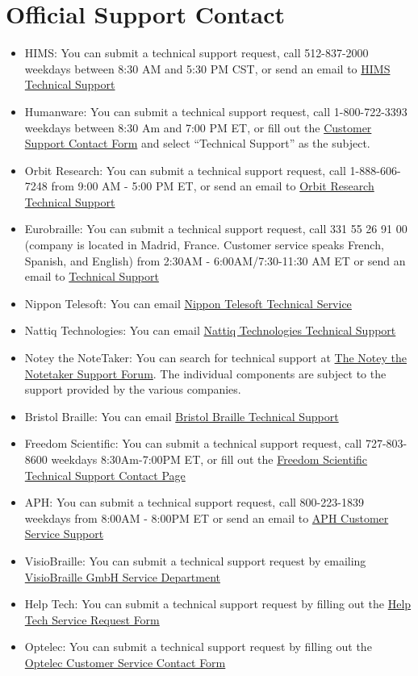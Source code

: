 \section{Official Support Contact}\label{report2}
\begin{itemize}
 \item HIMS: You can submit a technical support request, call 512-837-2000 weekdays between 8:30 AM and 5:30 PM CST, or send an email to \href{mailto:support@hims-inc.com}{HIMS Technical Support}
 \item Humanware: You can submit a technical support request, call 1-800-722-3393 weekdays between 8:30 Am and 7:00 PM ET, or fill out the \href{http://store.humanware.com/hus/contact/}{Customer Support Contact Form} and select ``Technical Support'' as the subject.
 \item Orbit Research: You can submit a technical support request, call 1-888-606-7248 from 9:00 AM - 5:00 PM ET, or send an email to \href{mailto:techsupport@orbitresearch.com}{Orbit Research Technical Support}
 \item Eurobraille: You can submit a technical support request, call 331 55 26 91 00 (company is located in Madrid, France. Customer service speaks French, Spanish, and English) from 2:30AM - 6:00AM/7:30-11:30 AM ET or send an email to \href{mailto:econtact@eurobraille.fr}{Technical Support}
 \item Nippon Telesoft: You can email \href{mailto:ts-email@telesoft.co.jp}{Nippon Telesoft Technical Service}
 \item Nattiq Technologies: You can email \href{mailto:info@nattiq.com}{Nattiq Technologies Technical Support}
 \item Notey the NoteTaker: You can search for technical support at \href{http://notey-project.com/2023/03/31/notey-forum-tech-support/}{The Notey the Notetaker Support Forum}. The individual components are subject to the support provided by the various companies.
 \item Bristol Braille: You can email \href{mailto:support@bristolbraille.org}{Bristol Braille Technical Support}
 \item Freedom Scientific: You can submit a technical support request, call 727-803-8600 weekdays 8:30Am-7:00PM ET, or fill out the \href{http://support.freedomscientific.com/Forms/TechSupport}{Freedom Scientific Technical Support Contact Page}
 \item APH: You can submit a technical support request, call 800-223-1839 weekdays from 8:00AM - 8:00PM ET or send an email to \href{mailto:cs@aph.org}{APH Customer Service Support}
 \item VisioBraille: You can submit a technical support request by emailing \href{mailto:service@visiobraille.de}{VisioBraille GmbH Service Department}
 \item Help Tech: You can submit a technical support request by filling out the \href{http://www.helptech.eu/contact}{Help Tech Service Request Form}
 \item Optelec: You can submit a technical support request by filling out the \href{http://in.optelec.com/dealers/contactform}{Optelec Customer Service Contact Form}
\end{itemize}

